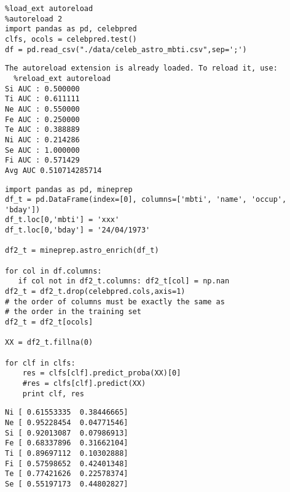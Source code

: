 \documentclass[12pt,fleqn]{article}\usepackage{../common}
\begin{document}
\begin{verbatim}
%load_ext autoreload
%autoreload 2
import pandas as pd, celebpred
clfs, ocols = celebpred.test()
df = pd.read_csv("./data/celeb_astro_mbti.csv",sep=';')
\end{verbatim}

\begin{verbatim}
The autoreload extension is already loaded. To reload it, use:
  %reload_ext autoreload
Si AUC : 0.500000
Ti AUC : 0.611111
Ne AUC : 0.550000
Fe AUC : 0.250000
Te AUC : 0.388889
Ni AUC : 0.214286
Se AUC : 1.000000
Fi AUC : 0.571429
Avg AUC 0.510714285714
\end{verbatim}


\begin{verbatim}
import pandas as pd, mineprep
df_t = pd.DataFrame(index=[0], columns=['mbti', 'name', 'occup', 'bday'])
df_t.loc[0,'mbti'] = 'xxx'
df_t.loc[0,'bday'] = '24/04/1973'

df2_t = mineprep.astro_enrich(df_t)

for col in df.columns: 
   if col not in df2_t.columns: df2_t[col] = np.nan
df2_t = df2_t.drop(celebpred.cols,axis=1)
# the order of columns must be exactly the same as 
# the order in the training set
df2_t = df2_t[ocols] 

XX = df2_t.fillna(0)

for clf in clfs: 
    res = clfs[clf].predict_proba(XX)[0]
    #res = clfs[clf].predict(XX)
    print clf, res
\end{verbatim}

\begin{verbatim}
Ni [ 0.61553335  0.38446665]
Ne [ 0.95228454  0.04771546]
Si [ 0.92013087  0.07986913]
Fe [ 0.68337896  0.31662104]
Ti [ 0.89697112  0.10302888]
Fi [ 0.57598652  0.42401348]
Te [ 0.77421626  0.22578374]
Se [ 0.55197173  0.44802827]
\end{verbatim}
\end{document}
